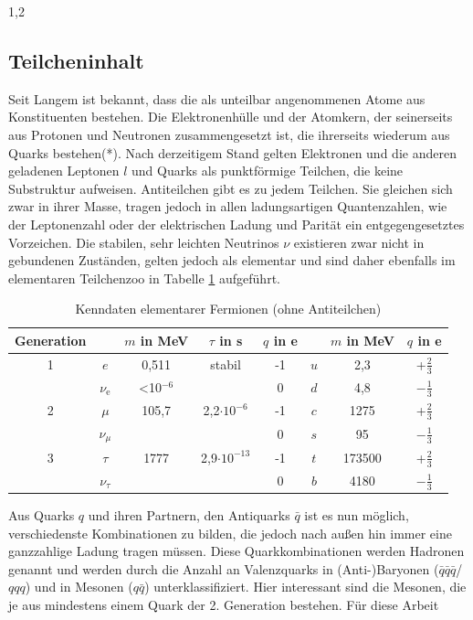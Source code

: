 \documentclass[11pt,a4paper,twoside,draft]{report}
\begin{document}
\begin{spacing}{1,2}
\subsection{Teilcheninhalt}
Seit Langem ist bekannt, dass die als unteilbar angenommenen Atome aus Konstituenten bestehen. Die Elektronenhülle und der Atomkern, der seinerseits aus
Protonen und Neutronen zusammengesetzt ist, die ihrerseits wiederum aus Quarks bestehen(*). Nach derzeitigem Stand gelten Elektronen und die anderen geladenen 
Leptonen $l$ und Quarks als punktförmige
Teilchen, die keine Substruktur aufweisen. Antiteilchen gibt es zu jedem Teilchen. Sie gleichen sich zwar in ihrer Masse, tragen jedoch in allen ladungsartigen Quantenzahlen, wie der Leptonenzahl oder
der elektrischen Ladung und Parität ein entgegengesetztes Vorzeichen. Die stabilen, sehr leichten Neutrinos $\nu$ existieren zwar nicht in gebundenen Zuständen, gelten jedoch als elementar und sind daher 
ebenfalls im elementaren Teilchenzoo \cite{PDG} in Tabelle \ref{tab_particlezoo} aufgeführt.
\begin{table}[H]
\begin{tabular}{c|cccc|ccc} \toprule 
 Generation & & $m$ in MeV & $\tau$ in s & $q$ in e & & $m$ in MeV & $q$ in e\\
 \midrule
  1 & $e$ & 0,511 & stabil & -1 & $u$ & 2,3 & +$\frac23$\\
  &$\nu_\text{e}$& <10$^{-6}$ &  & 0 & $d$ & 4,8 & $-\frac13$\\
  2 & $\mu$ & 105,7 & 2,2$\cdot 10^{-6}$ & -1 & $c$ &1275& +$\frac23$\\
  &$\nu_\mu$ & & & 0 & $s$ &95& $-\frac13$\\
  3& $\tau$ &1777& 2,9$\cdot 10^{-13}$ & -1 & $t$ & 173500 & +$\frac23$\\
  &$\nu_\tau$& & & 0 & $b$ &4180 & $-\frac13$
\\\bottomrule \bottomrule
 \end{tabular}
\caption{Kenndaten elementarer Fermionen (ohne Antiteilchen)}
\label{tab_particlezoo}
\end{table}
\noindent
Aus Quarks $q$ und ihren Partnern, den Antiquarks $\bar q$ ist es nun möglich, verschiedenste Kombinationen zu bilden, die jedoch nach außen hin immer eine
ganzzahlige Ladung tragen müssen. Diese Quarkkombinationen werden Hadronen genannt und werden durch die Anzahl an Valenzquarks in (Anti-)Baryonen ($\bar q\bar q\bar q$/$qqq$) und in 
Mesonen ($q\bar q$) unterklassifiziert. Hier interessant sind die Mesonen, die je aus mindestens einem Quark der 2. Generation bestehen. Für diese Arbeit

\end{spacing}
\end{document}
